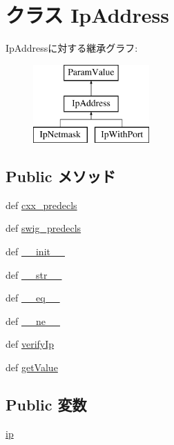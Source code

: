 \hypertarget{classm5_1_1params_1_1IpAddress}{
\section{クラス IpAddress}
\label{classm5_1_1params_1_1IpAddress}
}
IpAddressに対する継承グラフ:\begin{figure}[H]
\begin{center}
\leavevmode
\includegraphics[height=3cm]{classm5_1_1params_1_1IpAddress}
\end{center}
\end{figure}
\subsection*{Public メソッド}
\begin{DoxyCompactItemize}
\item 
def \hyperlink{classm5_1_1params_1_1IpAddress_a0b408a11a14bd1d770e28f71a6e14ab5}{cxx\_\-predecls}
\item 
def \hyperlink{classm5_1_1params_1_1IpAddress_ab3dbcf5716623eac67a8ccc074fa7e13}{swig\_\-predecls}
\item 
def \hyperlink{classm5_1_1params_1_1IpAddress_ac775ee34451fdfa742b318538164070e}{\_\-\_\-init\_\-\_\-}
\item 
def \hyperlink{classm5_1_1params_1_1IpAddress_aa7a4b9bc0941308e362738503137460e}{\_\-\_\-str\_\-\_\-}
\item 
def \hyperlink{classm5_1_1params_1_1IpAddress_a449f8fd74d358c0ad641b6c6d6917ba0}{\_\-\_\-eq\_\-\_\-}
\item 
def \hyperlink{classm5_1_1params_1_1IpAddress_ad69df72a6bf0be3525fe45cd2f77f343}{\_\-\_\-ne\_\-\_\-}
\item 
def \hyperlink{classm5_1_1params_1_1IpAddress_a11d6a8aa738696081239460999960001}{verifyIp}
\item 
def \hyperlink{classm5_1_1params_1_1IpAddress_acc340fbd4335fa34f9d57fb454b28ed0}{getValue}
\end{DoxyCompactItemize}
\subsection*{Public 変数}
\begin{DoxyCompactItemize}
\item 
\hyperlink{classm5_1_1params_1_1IpAddress_afd65cf072a93c93ad52b9f25b341e10b}{ip}
\end{DoxyCompactItemize}
